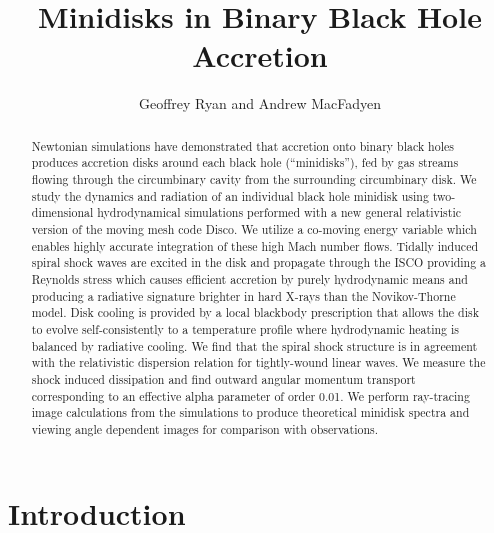 \documentclass{emulateapj}
\begin{document}
\title{Minidisks in Binary Black Hole Accretion}
\author{Geoffrey Ryan and Andrew MacFadyen}

\begin{abstract}

Newtonian simulations have demonstrated that accretion onto binary black holes produces accretion disks around each black hole (``minidisks''), fed by gas streams flowing through the circumbinary cavity from the surrounding circumbinary disk. We study the dynamics and radiation of an individual black hole minidisk using two-dimensional hydrodynamical simulations performed with a new general relativistic version of the moving mesh code Disco. We utilize a co-moving energy variable which enables highly accurate integration of these high Mach number flows. Tidally induced spiral shock waves are excited in the disk and propagate through the ISCO providing a Reynolds stress which causes efficient accretion by purely hydrodynamic means and producing a radiative signature brighter in hard X-rays than the Novikov-Thorne model. Disk cooling is provided by a local blackbody prescription that allows the disk to evolve self-consistently to a temperature profile where hydrodynamic heating is balanced by radiative cooling. We find that the spiral shock structure is in agreement with the relativistic dispersion relation for tightly-wound linear waves. We measure the shock induced dissipation and find outward angular momentum transport corresponding to an effective alpha parameter of order 0.01. We perform ray-tracing image calculations from the simulations to produce theoretical minidisk spectra and viewing angle dependent images for comparison with observations.

\end{abstract}



\section{Introduction}
\label{sec:intro}
\end{document}
